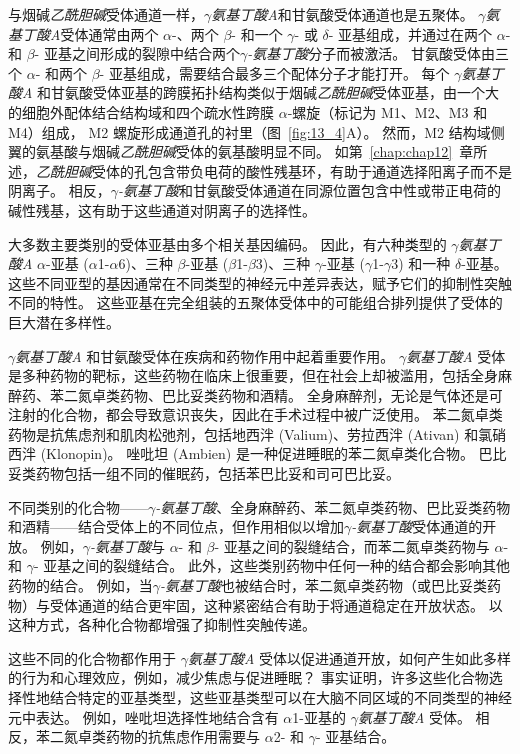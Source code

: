 与烟碱\textit{乙酰胆碱}受体通道一样，\textit{$\gamma$氨基丁酸A}和甘氨酸受体通道也是五聚体。
\textit{$\gamma$氨基丁酸A}受体通常由两个 $\alpha$-、两个 $\beta$- 和一个 $\gamma$- 或 $\delta$- 亚基组成，并通过在两个 $\alpha$- 和 $\beta$- 亚基之间形成的裂隙中结合两个\textit{$\gamma$-氨基丁酸}分子而被激活。
甘氨酸受体由三个 $\alpha$- 和两个 $\beta$- 亚基组成，需要结合最多三个配体分子才能打开。
每个 \textit{$\gamma$氨基丁酸A} 和甘氨酸受体亚基的跨膜拓扑结构类似于烟碱\textit{乙酰胆碱}受体亚基，由一个大的细胞外配体结合结构域和四个疏水性跨膜 $\alpha$-螺旋（标记为 M1、M2、M3 和 M4）组成， M2 螺旋形成通道孔的衬里（图~\ref{fig:13_4}A）。
然而，M2 结构域侧翼的氨基酸与烟碱\textit{乙酰胆碱}受体的氨基酸明显不同。
如第~\ref{chap:chap12}~章所述，\textit{乙酰胆碱}受体的孔包含带负电荷的酸性残基环，有助于通道选择阳离子而不是阴离子。
相反，\textit{$\gamma$-氨基丁酸}和甘氨酸受体通道在同源位置包含中性或带正电荷的碱性残基，这有助于这些通道对阴离子的选择性。


大多数主要类别的受体亚基由多个相关基因编码。
因此，有六种类型的 \textit{$\gamma$氨基丁酸A} $\alpha$-亚基 ($\alpha$1-$\alpha$6)、三种 $\beta$-亚基 ($\beta$1-$\beta$3)、三种 $\gamma$-亚基 ($\gamma$1-$\gamma$3) 和一种 $\delta$-亚基。
这些不同亚型的基因通常在不同类型的神经元中差异表达，赋予它们的抑制性突触不同的特性。
这些亚基在完全组装的五聚体受体中的可能组合排列提供了受体的巨大潜在多样性。


\textit{$\gamma$氨基丁酸A} 和甘氨酸受体在疾病和药物作用中起着重要作用。
\textit{$\gamma$氨基丁酸A} 受体是多种药物的靶标，这些药物在临床上很重要，但在社会上却被滥用，包括全身麻醉药、苯二氮卓类药物、巴比妥类药物和酒精。
全身麻醉剂，无论是气体还是可注射的化合物，都会导致意识丧失，因此在手术过程中被广泛使用。
苯二氮卓类药物是抗焦虑剂和肌肉松弛剂，包括地西泮 (Valium)、劳拉西泮 (Ativan) 和氯硝西泮 (Klonopin)。
唑吡坦 (Ambien) 是一种促进睡眠的苯二氮卓类化合物。
巴比妥类药物包括一组不同的催眠药，包括苯巴比妥和司可巴比妥。


不同类别的化合物——\textit{$\gamma$-氨基丁酸}、全身麻醉药、苯二氮卓类药物、巴比妥类药物和酒精——结合受体上的不同位点，但作用相似以增加\textit{$\gamma$-氨基丁酸}受体通道的开放。
例如，\textit{$\gamma$-氨基丁酸}与 $\alpha$- 和 $\beta$- 亚基之间的裂缝结合，而苯二氮卓类药物与 $\alpha$- 和 $\gamma$- 亚基之间的裂缝结合。
此外，这些类别药物中任何一种的结合都会影响其他药物的结合。
例如，当\textit{$\gamma$-氨基丁酸}也被结合时，苯二氮卓类药物（或巴比妥类药物）与受体通道的结合更牢固，这种紧密结合有助于将通道稳定在开放状态。
以这种方式，各种化合物都增强了抑制性突触传递。


这些不同的化合物都作用于 \textit{$\gamma$氨基丁酸A} 受体以促进通道开放，如何产生如此多样的行为和心理效应，例如，减少焦虑与促进睡眠？
事实证明，许多这些化合物选择性地结合特定的亚基类型，这些亚基类型可以在大脑不同区域的不同类型的神经元中表达。
例如，唑吡坦选择性地结合含有 $\alpha$1-亚基的 \textit{$\gamma$氨基丁酸A} 受体。
相反，苯二氮卓类药物的抗焦虑作用需要与 $\alpha$2- 和 $\gamma$- 亚基结合。


